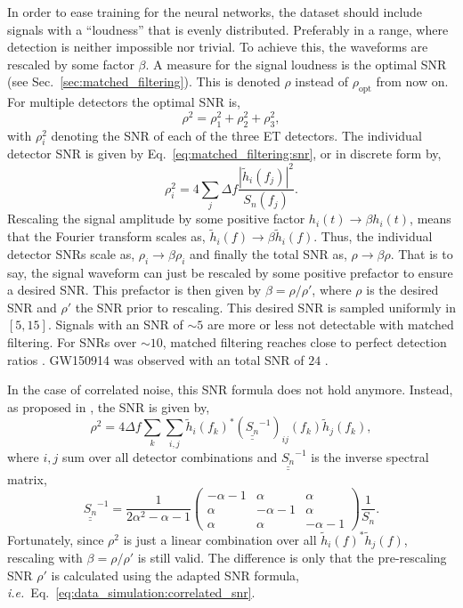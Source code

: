 In order to ease training for the neural networks, the dataset should include signals with a \enquote{loudness} that is evenly distributed. Preferably in a range, where detection is neither impossible nor trivial. To achieve this, the waveforms are rescaled by some factor $\beta$. 
A measure for the signal loudness is the optimal SNR (see Sec.~\ref{sec:matched_filtering}). This is denoted $\rho$ instead of $\rho_\text{opt}$ from now on. For multiple detectors the optimal SNR is,
\begin{equation}
	\rho^2 = \rho^2_1 + \rho^2_2 + \rho^2_3,
\end{equation}
with $\rho^2_i$ denoting the SNR of each of the three ET detectors. The individual detector SNR is given by Eq.~\ref{eq:matched_filtering:snr}, or in discrete form by,
\begin{equation}
	\rho^2_i = 4 \sum_j \Delta f \frac{|\tilde{h}_i(f_j)|^2}{S_n(f_j)}.
\end{equation}
Rescaling the signal amplitude by some positive factor $h_i(t)\rightarrow\beta h_i(t)$, means that the Fourier transform scales as, $\tilde{h}_i(f)\rightarrow\beta\tilde{h}_i(f)$. Thus, the individual detector SNRs scale as, $\rho_i\rightarrow\beta\rho_i$ and finally the total SNR as, $\rho\rightarrow\beta\rho$. That is to say, the signal waveform can just be rescaled by some positive prefactor to ensure a desired SNR. This prefactor is then given by $\beta = \rho / \rho'$, where $\rho$ is the desired SNR and $\rho'$ the SNR prior to rescaling. This desired SNR is sampled uniformly in $[5, 15]$. Signals with an SNR of $\sim5$ are more or less not detectable with matched filtering. For SNRs over $\sim10$, matched filtering reaches close to perfect detection ratios \cite{Nitz_2017}. GW150914 was observed with an total SNR of $24$ \cite{PhysRevLett.116.061102}.

In the case of correlated noise, this SNR formula does not hold anymore. Instead, as proposed in \cite{PhysRevD.110.104060}, the SNR is given by,
\begin{equation}
	\label{eq:data_simulation:correlated_snr}
	\rho^2 = 4 \Delta f \sum_k \sum_{i,j}
	\tilde{h}_i(f_k)^*(\underline{\underline{S_n}}^{-1})_{ij}(f_k)\tilde{h}_j(f_k),
\end{equation}
where $i,j$ sum over all detector combinations and $\underline{\underline{S_n}}^{-1}$ is the inverse spectral matrix,
\begin{equation}
	\underline{\underline{S_n}}^{-1} = \frac{1}{2\alpha^2 - \alpha - 1}
	\begin{pmatrix}
		-\alpha-1 & \alpha & \alpha \\
		\alpha & -\alpha-1 & \alpha \\
		\alpha & \alpha & -\alpha-1
	\end{pmatrix} \frac{1}{S_n}.
\end{equation}
Fortunately, since $\rho^2 $ is just a linear combination over all $\tilde{h}_i(f)^*\tilde{h}_j(f)$, rescaling with $\beta = \rho / \rho'$ is still valid. The difference is only that the pre-rescaling SNR $\rho'$ is calculated using the adapted SNR formula, \emph{i.e.}\ Eq.~\ref{eq:data_simulation:correlated_snr}.

